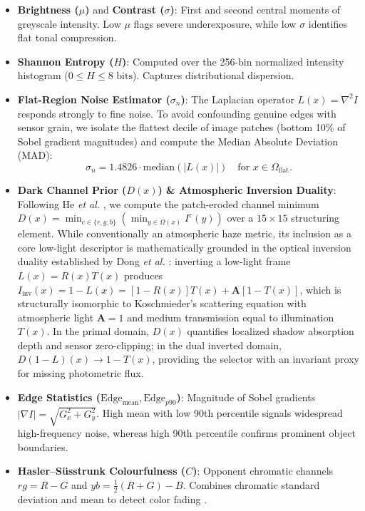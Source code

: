 \documentclass[journal]{IEEEtran}
\begin{document}
\begin{itemize}
    \item \textbf{Brightness ($\mu$)} and \textbf{Contrast ($\sigma$)}: First and second central moments of greyscale intensity. Low $\mu$ flags severe underexposure, while low $\sigma$ identifies flat tonal compression.
    \item \textbf{Shannon Entropy ($H$)}: Computed over the 256-bin normalized intensity histogram ($0 \le H \le 8\text{ bits}$). Captures distributional dispersion.
    \item \textbf{Flat-Region Noise Estimator ($\sigma_n$)}: The Laplacian operator $L(x) = \nabla^2 I$ responds strongly to fine noise. To avoid confounding genuine edges with sensor grain, we isolate the flattest decile of image patches (bottom 10\% of Sobel gradient magnitudes) and compute the Median Absolute Deviation (MAD):
    \begin{equation}
    \sigma_n = 1.4826 \cdot \text{median}\left( \left| L(x) \right| \right) \quad \text{for } x \in \Omega_{\text{flat}}.
    \end{equation}
    \item \textbf{Dark Channel Prior ($D(x)$) \& Atmospheric Inversion Duality}: Following He \textit{et al.} \cite{he2011single}, we compute the patch-eroded channel minimum $D(x) = \min_{c \in \{r,g,b\}} (\min_{y \in \Omega(x)} I^c(y))$ over a $15 \times 15$ structuring element. While conventionally an atmospheric haze metric, its inclusion as a core low-light descriptor is mathematically grounded in the optical inversion duality established by Dong \textit{et al.} \cite{dong2011fast}: inverting a low-light frame $L(x) = R(x) T(x)$ produces $I_{\text{inv}}(x) = 1 - L(x) = [1 - R(x)] T(x) + \mathbf{A}[1 - T(x)]$, which is structurally isomorphic to Koschmieder's scattering equation \cite{koschmieder1924theorie} with atmospheric light $\mathbf{A}=1$ and medium transmission equal to illumination $T(x)$. In the primal domain, $D(x)$ quantifies localized shadow absorption depth and sensor zero-clipping; in the dual inverted domain, $D(1-L)(x) \to 1 - T(x)$, providing the selector with an invariant proxy for missing photometric flux.
    \item \textbf{Edge Statistics ($\text{Edge}_{\text{mean}}, \text{Edge}_{p90}$)}: Magnitude of Sobel gradients $|\nabla I| = \sqrt{G_x^2 + G_y^2}$. High mean with low 90th percentile signals widespread high-frequency noise, whereas high 90th percentile confirms prominent object boundaries.
    \item \textbf{Hasler--Süsstrunk Colourfulness ($C$)}: Opponent chromatic channels $rg = R - G$ and $yb = \frac{1}{2}(R + G) - B$. Combines chromatic standard deviation and mean to detect color fading \cite{hasler2003measuring}.
\end{itemize}
\end{document}
